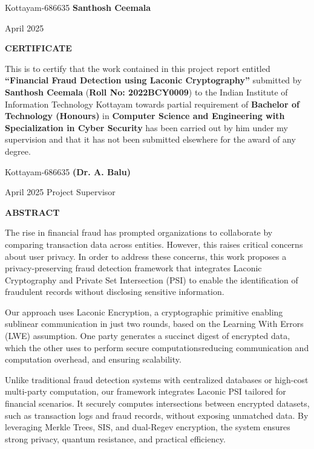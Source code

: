 \documentclass[12pt,a4paper]{report}
\theoremstyle{plain}
\theoremstyle{definition}
\theoremstyle{remark}
\begin{document}
\vspace{4cm}

\noindent Kottayam-686635 \hfill \textbf{Santhosh Ceemala}

\noindent April 2025

\clearpage

\begin{center}
{\large{\bf{CERTIFICATE}}}
\end{center}

\noindent This is to certify that the work contained in this
project report entitled \textbf{``Financial Fraud Detection using Laconic Cryptography''}
submitted by \textbf{Santhosh Ceemala} (\textbf{Roll No: 2022BCY0009}) to the Indian Institute of Information Technology Kottayam
towards partial requirement of {\bf Bachelor of Technology (Honours)} in
\textbf{Computer Science and Engineering with Specialization in Cyber Security} has been carried out by him under my
supervision and that it has not been submitted elsewhere for the
award of any degree.

\vspace{4cm}

\noindent Kottayam-686635 \hfill \textbf{(Dr. A. Balu)}

\noindent April 2025 \hfill Project Supervisor

\clearpage

\begin{center}
{\Large{\bf{ABSTRACT}}}
\end{center}

The rise in financial fraud has prompted organizations to collaborate by comparing transaction data across entities. However, this raises critical concerns about user privacy. In order to address these concerns, this work proposes a privacy-preserving fraud detection framework that integrates Laconic Cryptography and Private Set Intersection (PSI) to enable the identification of fraudulent records without disclosing sensitive information.

Our approach uses Laconic Encryption, a cryptographic primitive enabling sublinear communication in just two rounds, based on the Learning With Errors (LWE) assumption. One party generates a succinct digest of encrypted data, which the other uses to perform secure computations\textemdash reducing communication and computation overhead, and ensuring scalability.

Unlike traditional fraud detection systems with centralized databases or high-cost multi-party computation, our framework integrates Laconic PSI tailored for financial scenarios. It securely computes intersections between encrypted datasets, such as transaction logs and fraud records, without exposing unmatched data. By leveraging Merkle Trees, SIS, and dual-Regev encryption, the system ensures strong privacy, quantum resistance, and practical efficiency.
\end{document}
